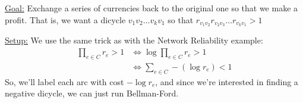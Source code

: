 \underline{Goal:} Exchange a series of currencies back to the original one so that we make a profit. That is, we want a dicycle $v_1v_2\ldots v_kv_1$ so that $r_{v_1v_2}r_{v_2v_3}\ldots r_{v_kv_1} > 1$

\underline{Setup:} We use the same trick as with the Network Reliability example:
\begin{align*}
    \prod_{e \in C}r_e > 1 &\Leftrightarrow \log \prod_{e \in C} r_e > 1 \\ 
    &\Leftrightarrow \sum_{e \in C} -(\log r_e) < 1
\end{align*}
So, we'll label each arc with cost $-\log r_e$, and since we're interested in finding a negative dicycle, we can just run Bellman-Ford.